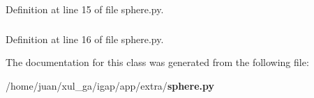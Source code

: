 Definition at line 15 of file sphere.py.
\subsubsection{}\label{classsphere_1_1myGLCanvas_b1e2119c42f5edc6cbe5ba5691b025ad}




Definition at line 16 of file sphere.py.

The documentation for this class was generated from the following file:\begin{CompactItemize}
\item 
/home/juan/xul\_\-ga/igap/app/extra/{\bf sphere.py}\end{CompactItemize}
